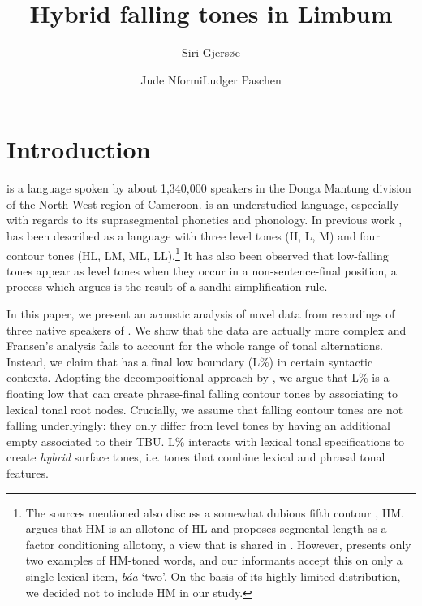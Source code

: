 \documentclass[output=paper,newtxmath,modfonts,nonflat,hidelinks]{langsci/langscibook}
\author{{Siri Gjers\o e}\affiliation{Leipzig University}\and Jude Nformi\affiliation{Leipzig University}\lastand Ludger Paschen\affiliation{Leipzig University}}
\title{Hybrid falling tones in Limbum}
\begin{document}
\maketitle


 

\section{Introduction}

 is a   language spoken by about 1,340,000 speakers in the Donga Mantung division of the North West region of Cameroon.
 is an understudied language, especially with regards to its suprasegmental phonetics and phonology.
In previous work \citep{Fiore.1987,Fransen.1995},  has been described as a  language with three level tones (H, L, M) and four contour tones (HL, LM, ML, LL).\footnote{The sources mentioned also discuss a somewhat dubious fifth contour , HM. \citet{Fiore.1987} argues that HM is an allotone of HL and proposes segmental length as a factor conditioning allotony, a view that is shared in \citet{Fransen.1995}. However, \citet{Fiore.1987} presents only two examples of HM-toned words, and our informants accept this  on only a single lexical item, \textit{bá\=a} `two'. On the basis of its highly limited distribution, we decided not to include HM in our study.\label{footnote:gjersoe:testsentences}}
It has also been observed that low-falling tones appear as level tones when they occur in a non-sentence-final position, a process which \citet{Fransen.1995} argues is the result of a sandhi simplification rule.

In this paper, we present an acoustic analysis of novel data from recordings of three native speakers of .
We show that the data are actually more complex and Fransen's analysis fails to account for the whole range of tonal alternations.
Instead, we claim that  has a final low boundary  (L\%) in certain syntactic contexts.
Adopting the decompositional approach by \citet{Snider.1999}, we argue that L\% is a floating low  that can create phrase-final falling contour tones by associating to lexical tonal root nodes.
Crucially, we assume that falling contour tones are not falling underlyingly: they only differ from {level tones} by having an additional empty  associated to their TBU.
L\% interacts with lexical tonal specifications to create \textit{hybrid} surface tones, i.e. tones that combine lexical and phrasal tonal features.
\end{document}
